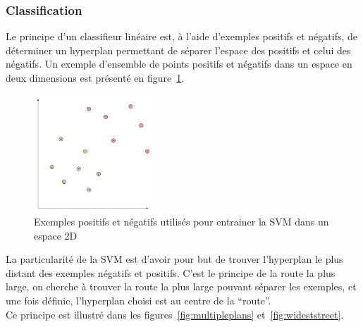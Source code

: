 \documentclass[12pt]{article}
\begin{document}
\subsubsection{Classification}
Le principe d'un classifieur linéaire est, à l'aide d’exemples positifs et négatifs, de déterminer un hyperplan permettant de séparer l'espace des positifs et celui des négatifs. Un exemple d'ensemble de points positifs et négatifs dans un espace en deux dimensions est présenté en figure~\ref{fig:trainingexamples}.
\begin{figure}[!ht]
    \centering
	    \includegraphics[width=0.4\textwidth]{img/trainingexamples.png}
	    \caption{Exemples positifs et négatifs utilisés pour entrainer la SVM dans un espace 2D}
        \label{fig:trainingexamples}
\end{figure}
La particularité de la SVM est d'avoir pour but de trouver l'hyperplan le plus distant des exemples négatifs et positifs. C'est le principe de la route la plus large, on cherche à trouver la route la plus large pouvant séparer les exemples, et une fois définie, l'hyperplan choisi est au centre de la ``route''.\\
Ce principe est illustré dans les figures~\ref{fig:multipleplans} et~\ref{fig:wideststreet}.
\end{document}

